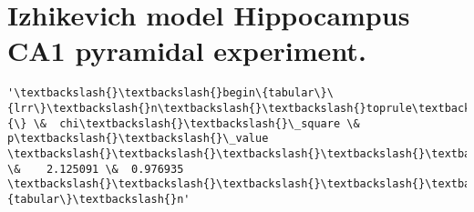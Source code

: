     \hypertarget{izhikevich-model-hippocampus-ca1-pyramidal-experiment.}{%
\section{Izhikevich model Hippocampus CA1 pyramidal
experiment.}\label{izhikevich-model-hippocampus-ca1-pyramidal-experiment.}}

            \begin{tcolorbox}[breakable, size=fbox, boxrule=.5pt, pad at break*=1mm, opacityfill=0]
\begin{Verbatim}[commandchars=\\\{\}]
'\textbackslash{}\textbackslash{}begin\{tabular\}\{lrr\}\textbackslash{}n\textbackslash{}\textbackslash{}toprule\textbackslash{}n\{\} \&  chi\textbackslash{}\textbackslash{}\_square \&   p\textbackslash{}\textbackslash{}\_value
\textbackslash{}\textbackslash{}\textbackslash{}\textbackslash{}\textbackslash{}n\textbackslash{}\textbackslash{}midrule\textbackslash{}n0 \&    2.125091 \&  0.976935
\textbackslash{}\textbackslash{}\textbackslash{}\textbackslash{}\textbackslash{}n\textbackslash{}\textbackslash{}bottomrule\textbackslash{}n\textbackslash{}\textbackslash{}end\{tabular\}\textbackslash{}n'
\end{Verbatim}
\end{tcolorbox}
        
